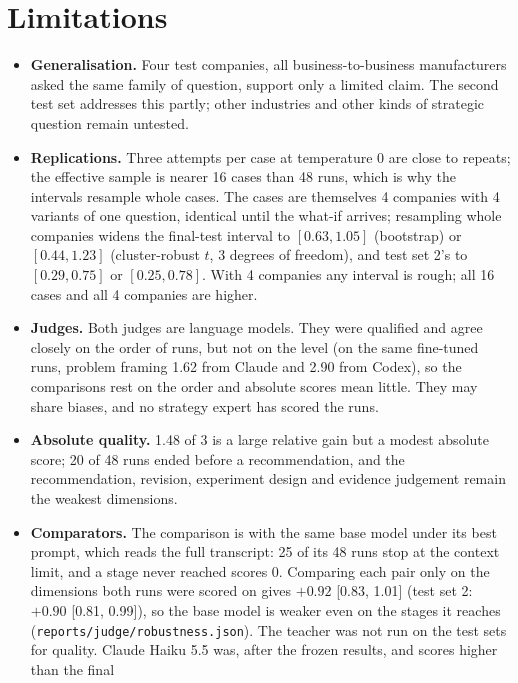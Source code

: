 \section{Limitations}\label{sec:limits}
\begin{itemize}
  \item \textbf{Generalisation.} Four test companies, all business-to-business manufacturers asked the same family of
        question, support only a limited claim. The second test set addresses this partly; other industries and other
        kinds of strategic question remain untested.
  \item \textbf{Replications.} Three attempts per case at temperature 0 are close to repeats; the effective sample is
        nearer 16 cases than 48 runs, which is why the intervals resample whole cases. The cases are themselves 4
        companies with 4 variants of one question, identical until the what-if arrives; resampling whole companies
        widens the final-test interval to $[0.63, 1.05]$ (bootstrap) or $[0.44, 1.23]$ (cluster-robust $t$, 3 degrees of
        freedom), and test set 2's to $[0.29, 0.75]$ or $[0.25, 0.78]$. With 4 companies any interval is rough; all 16
        cases and all 4 companies are higher.
  \item \textbf{Judges.} Both judges are language models. They were qualified and agree closely on the order of runs,
        but not on the level (on the same fine-tuned runs, problem framing 1.62 from Claude and 2.90 from Codex), so the
        comparisons rest on the order and absolute scores mean little. They may share biases, and no strategy expert has
        scored the runs.
  \item \textbf{Absolute quality.} 1.48 of 3 is a large relative gain but a modest absolute score; 20 of 48 runs ended
        before a recommendation, and the recommendation, revision, experiment design and evidence judgement remain the
        weakest dimensions.
  \item \textbf{Comparators.} The comparison is with the same base model under its best prompt, which reads the full
        transcript: 25 of its 48 runs stop at the context limit, and a stage never reached scores 0. Comparing each pair
        only on the dimensions both runs were scored on gives $+0.92$ [0.83, 1.01] (test set 2: $+0.90$ [0.81, 0.99]), so
        the base model is weaker even on the stages it reaches (\texttt{reports/judge/robustness.json}). The teacher was not run
        on the test sets for quality. Claude Haiku 5.5 was, after the frozen results, and scores higher than the final

\end{itemize}
